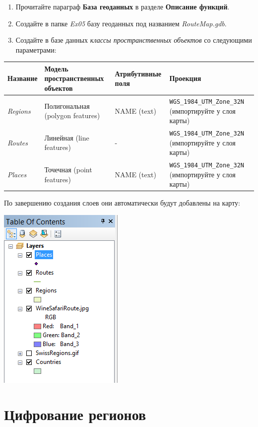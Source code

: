 \documentclass[12pt,]{book}
\begin{document}
\begin{enumerate}
\def\labelenumi{\arabic{enumi}.}
\item
  Прочитайте параграф \textbf{База геоданных} в разделе \textbf{Описание функций}.
\item
  Создайте в папке \emph{Ex05} базу геоданных под названием \emph{RouteMap.gdb}.
\item
  Создайте в базе данных \emph{классы пространственных объектов} со следующими параметрами:
\end{enumerate}

\begin{longtable}[]{@{}llll@{}}
\toprule
Название & Модель пространственных объектов & Атрибутивные поля & Проекция\tabularnewline
\midrule
\endhead
\emph{Regions} & Полигональная (polygon features) & NAME (text) & \texttt{WGS\_1984\_UTM\_Zone\_32N} (импортируйте у слоя карты)\tabularnewline
\emph{Routes} & Линейная (line features) & - & \texttt{WGS\_1984\_UTM\_Zone\_32N} (импортируйте у слоя карты)\tabularnewline
\emph{Places} & Точечная (point features) & NAME (text) & \texttt{WGS\_1984\_UTM\_Zone\_32N} (импортируйте у слоя карты)\tabularnewline
\bottomrule
\end{longtable}

По завершению создания слоев они автоматически будут добавлены на карту:

\includegraphics{images/Ex05/image14.png}

\hypertarget{map-ref-general-digitizing}{%
\section{Цифрование регионов}\label{map-ref-general-digitizing}}
\end{document}
